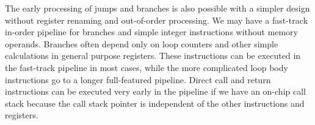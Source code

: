 \documentclass[forwardcom.tex]{subfiles}
\begin{document}
The early processing of jumps and branches is also possible with a simpler design without register renaming and out-of-order processing. We may have a fast-track in-order pipeline for branches and simple integer instructions without memory operands. Branches often depend only on loop counters and other simple calculations in general purpose registers. These instructions can be executed in the fast-track pipeline in most cases, while the more complicated loop body instructions go to a longer full-featured pipeline. Direct call and return instructions can be executed very early in the pipeline if we have an on-chip call stack because the call stack pointer is independent of the other instructions and registers.
\vspace{2mm}
\end{document}
